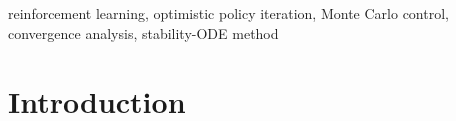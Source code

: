 \documentclass[twoside,11pt]{article}
\begin{document}

\begin{keywords}
reinforcement learning, optimistic policy iteration, Monte Carlo control, convergence analysis, stability-ODE method
\end{keywords}

\section{Introduction}



\end{document}
